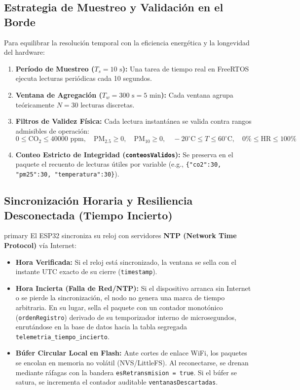 \documentclass[11pt,a4paper]{article}
\begin{document}
\subsection{Estrategia de Muestreo y Validación en el Borde}
Para equilibrar la resolución temporal con la eficiencia energética y la longevidad del hardware:
\begin{enumerate}
    \item \textbf{Período de Muestreo ($T_s = 10\text{ s}$):} Una tarea de tiempo real en FreeRTOS ejecuta lecturas periódicas cada 10 segundos.
    \item \textbf{Ventana de Agregación ($T_w = 300\text{ s} = 5\text{ min}$):} Cada ventana agrupa teóricamente $N = 30\text{ lecturas}$ discretas.
    \item \textbf{Filtros de Validez Física:} Cada lectura instantánea se valida contra rangos admisibles de operación:
    \[ 0 \le \text{CO}_2 \le 40000\text{ ppm},\quad \text{PM}_{2.5} \ge 0,\quad \text{PM}_{10} \ge 0,\quad -20^\circ\text{C} \le T \le 60^\circ\text{C},\quad 0\% \le \text{HR} \le 100\% \]
    \item \textbf{Conteo Estricto de Integridad (\texttt{conteosValidos}):} Se preserva en el paquete el recuento de lecturas útiles por variable (e.g., \texttt{\{"co2":30, "pm25":30, "temperatura":30\}}).
\end{enumerate}

\subsection{Sincronización Horaria y Resiliencia Desconectada (Tiempo Incierto)}
\begin{calloutbox}[title=Manejo de Desconexión y Sincronización Temporal]{primary}
El ESP32 sincroniza su reloj con servidores \textbf{NTP (Network Time Protocol)} vía Internet:
\begin{itemize}
    \item \textbf{Hora Verificada:} Si el reloj está sincronizado, la ventana se sella con el instante UTC exacto de su cierre (\texttt{timestamp}).
    \item \textbf{Hora Incierta (Falla de Red/NTP):} Si el dispositivo arranca sin Internet o se pierde la sincronización, el nodo no genera una marca de tiempo arbitraria. En su lugar, sella el paquete con un contador monotónico (\texttt{ordenRegistro}) derivado de su temporizador interno de microsegundos, enrutándose en la base de datos hacia la tabla segregada \texttt{telemetria\_tiempo\_incierto}.
    \item \textbf{Búfer Circular Local en Flash:} Ante cortes de enlace WiFi, los paquetes se encolan en memoria no volátil (NVS/LittleFS). Al reconectarse, se drenan mediante ráfagas con la bandera \texttt{esRetransmision = true}. Si el búfer se satura, se incrementa el contador auditable \texttt{ventanasDescartadas}.
\end{itemize}
\end{calloutbox}
\end{document}
